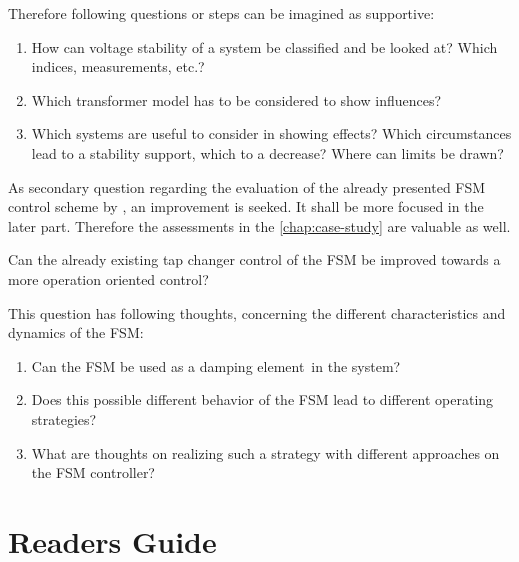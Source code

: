 Therefore following questions or steps can be imagined as supportive:
\begin{enumerate}
    \item How can voltage stability of a system be classified and be looked at? Which indices, measurements, etc.?
    \item Which transformer model has to be considered to show influences?
    \item Which systems are useful to consider in showing effects? Which circumstances lead to a stability support, which to a decrease? Where can limits be drawn?
\end{enumerate}

As secondary question regarding the evaluation of the already presented \acs{FSM} control scheme by \textcite{burlakin_2024}, an improvement is seeked.
It shall be more focused in the later part.
Therefore the assessments in the \autoref{chap:case-study} are valuable as well.

\begin{tcolorbox}[float, colback=ees_green!5!white,colframe=ees_green, toptitle=1mm, bottomtitle=1mm, left=2mm, right=2.5mm, top=2mm, bottom=2mm, title={\textbf{Additional Question of this Thesis}}]
    Can the already existing tap changer control of the \acf{FSM} be improved towards a more operation oriented control?
\end{tcolorbox}

This question has following thoughts, concerning the different characteristics and dynamics of the \acs{FSM}:
\begin{enumerate}
    \item Can the \acs{FSM} be used as a \glqq damping element\grqq~in the system?
    \item Does this possible different behavior of the \acs{FSM} lead to different operating strategies?
    \item What are thoughts on realizing such a strategy with different approaches on the \acs{FSM} controller?
\end{enumerate}

\section{Readers Guide}

